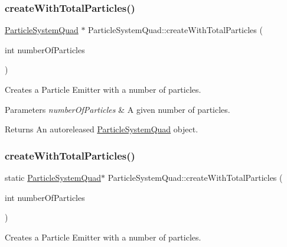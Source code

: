 \subsubsection{\texorpdfstring{create\+With\+Total\+Particles()}{createWithTotalParticles()}\hspace{0.1cm}{\footnotesize\ttfamily [1/2]}}
{\footnotesize\ttfamily \hyperlink{classParticleSystemQuad}{Particle\+System\+Quad} $\ast$ Particle\+System\+Quad\+::create\+With\+Total\+Particles (\begin{DoxyParamCaption}\item[{int}]{number\+Of\+Particles }\end{DoxyParamCaption})\hspace{0.3cm}{\ttfamily [static]}}

Creates a Particle Emitter with a number of particles.


\begin{DoxyParams}{Parameters}
{\em number\+Of\+Particles} & A given number of particles. \\
\hline
\end{DoxyParams}
\begin{DoxyReturn}{Returns}
An autoreleased \hyperlink{classParticleSystemQuad}{Particle\+System\+Quad} object. 
\end{DoxyReturn}
\mbox{\label{classParticleSystemQuad_a21ecb08baf720ee1fee803be92b05e0f}} 
\subsubsection{\texorpdfstring{create\+With\+Total\+Particles()}{createWithTotalParticles()}\hspace{0.1cm}{\footnotesize\ttfamily [2/2]}}
{\footnotesize\ttfamily static \hyperlink{classParticleSystemQuad}{Particle\+System\+Quad}$\ast$ Particle\+System\+Quad\+::create\+With\+Total\+Particles (\begin{DoxyParamCaption}\item[{int}]{number\+Of\+Particles }\end{DoxyParamCaption})\hspace{0.3cm}{\ttfamily [static]}}

Creates a Particle Emitter with a number of particles.


